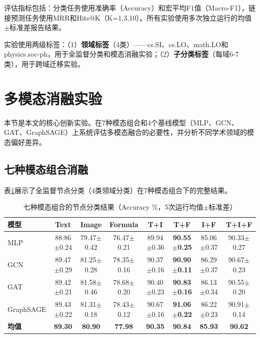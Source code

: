 评估指标包括：分类任务使用准确率（Accuracy）和宏平均F1值（Macro-F1），链接预测任务使用MRR和Hits@K（K=1,3,10）。所有实验使用多次独立运行的均值$\pm$标准差报告结果。

实验使用两级标签：（1）\textbf{领域标签}（4类）——cs.SI、cs.LO、math.LO和physics.soc-ph，用于全监督分类和模态消融实验；（2）\textbf{子分类标签}（每域6-7类），用于跨域迁移实验。

\section{多模态消融实验}

本节是本文的核心创新实验。在7种模态组合和4个基线模型（MLP、GCN、GAT、GraphSAGE）上系统评估多模态融合的必要性，并分析不同学术领域的模态偏好差异。

\subsection{七种模态组合消融}

表\ref{tab:nc_7modality}展示了全监督节点分类（4类领域分类）在7种模态组合下的完整结果。

\begin{table}[htbp]
  \centering
  \caption{七种模态组合的节点分类结果（Accuracy \%，5次运行均值$\pm$标准差）}
  \label{tab:nc_7modality}
  \small
  \begin{tabular}{lccccccc}
    \toprule
    模型 & Text & Image & Formula & T+I & T+F & I+F & T+I+F \\
    \midrule
    MLP & 88.86$\pm$0.24 & 79.47$\pm$0.42 & 76.47$\pm$0.21 & 89.94$\pm$0.36 & \textbf{90.55$\pm$0.25} & 85.06$\pm$0.37 & 90.33$\pm$0.27 \\
    GCN & 89.47$\pm$0.29 & 81.25$\pm$0.28 & 78.35$\pm$0.16 & 90.37$\pm$0.16 & \textbf{90.90$\pm$0.11} & 86.29$\pm$0.37 & 90.67$\pm$0.23 \\
    GAT & 89.42$\pm$0.21 & 81.58$\pm$0.46 & 78.68$\pm$0.20 & 90.40$\pm$0.23 & \textbf{90.83$\pm$0.16} & 86.13$\pm$0.34 & 90.55$\pm$0.20 \\
    GraphSAGE & 89.43$\pm$0.22 & 81.31$\pm$0.18 & 78.43$\pm$0.12 & 90.67$\pm$0.16 & \textbf{91.06$\pm$0.22} & 86.22$\pm$0.23 & 90.91$\pm$0.14 \\
    \midrule
    \textbf{均值} & \textbf{89.30} & \textbf{80.90} & \textbf{77.98} & \textbf{90.35} & \textbf{90.84} & \textbf{85.93} & \textbf{90.62} \\
    \bottomrule
  \end{tabular}
\end{table}

